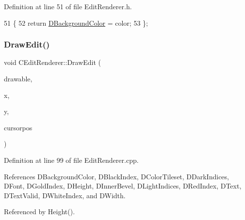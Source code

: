 Definition at line 51 of file Edit\+Renderer.\+h.


\begin{DoxyCode}
51                                                         \{
52             \textcolor{keywordflow}{return} \hyperlink{classCEditRenderer_a7e5e1b18db4c53fe288c200aed673ccf}{DBackgroundColor} = color;
53         \};
\end{DoxyCode}
\hypertarget{classCEditRenderer_a3b043cca5f931cdbbfff35d07100be5e}{}\label{classCEditRenderer_a3b043cca5f931cdbbfff35d07100be5e} 
\subsubsection{\texorpdfstring{Draw\+Edit()}{DrawEdit()}}
{\footnotesize\ttfamily void C\+Edit\+Renderer\+::\+Draw\+Edit (\begin{DoxyParamCaption}\item[{Gdk\+Drawable $\ast$}]{drawable,  }\item[{int}]{x,  }\item[{int}]{y,  }\item[{int}]{cursorpos }\end{DoxyParamCaption})}



Definition at line 99 of file Edit\+Renderer.\+cpp.



References D\+Background\+Color, D\+Black\+Index, D\+Color\+Tileset, D\+Dark\+Indices, D\+Font, D\+Gold\+Index, D\+Height, D\+Inner\+Bevel, D\+Light\+Indices, D\+Red\+Index, D\+Text, D\+Text\+Valid, D\+White\+Index, and D\+Width.



Referenced by Height().


